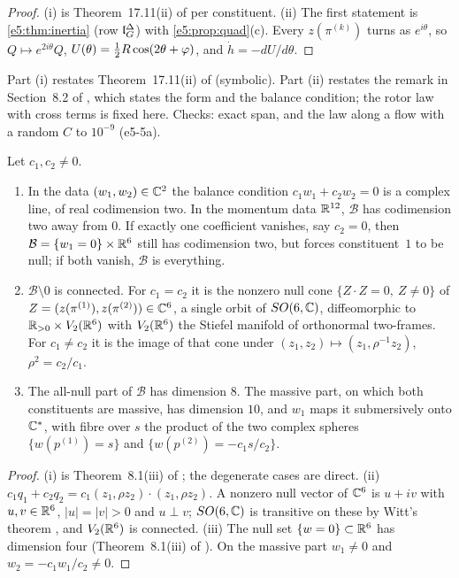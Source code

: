 \begin{proof}
(i) is Theorem~17.11(ii) of \cite{ES17} per constituent. (ii) The first statement is \cref{e5:thm:inertia} (row $\mathfrak l_G^\Delta$) with \cref{e5:prop:quad}(c). Every
$z(\pi^{(k)})$ turns as $e^{i\theta}$, so $Q\mapsto e^{2i\theta}Q$, $U(\theta)=\tfrac12 R\cos(2\theta+\varphi)$, and $\dot h=-dU/d\theta$.
\end{proof}

Part (i) restates Theorem~17.11(ii) of \cite{ES17} (symbolic). Part (ii) restates the remark in Section~8.2 of \cite{RE}, which states the form and the
balance condition; the rotor law with cross terms is fixed here. Checks: exact span, and the law along a flow with a random $C$ to $10^{-9}$ (e5-5a).

\begin{proposition}
\label{e5:prop:Bgeom}
Let $c_1,c_2\neq0$.
\begin{enumerate}[label=(\roman*),leftmargin=2.2em]
\item In the data $(w_1,w_2)\in\mathbb{C}^2$ the balance condition $c_1w_1+c_2w_2=0$ is a complex line, of real codimension two. In the momentum data
$\mathbb{R}^{12}$, $\mathcal B$ has codimension two away from $0$. If exactly one coefficient vanishes, say $c_2=0$, then $\mathcal B=\{w_1=0\}\times\mathbb{R}^6$
still has codimension two, but forces constituent~$1$ to be null; if both vanish, $\mathcal B$ is everything.
\item $\mathcal B\setminus0$ is connected. For $c_1=c_2$ it is the nonzero null cone $\{Z\cdot Z=0,\ Z\neq0\}$ of $Z=(z(\pi^{(1)}),z(\pi^{(2)}))\in\mathbb{C}^6$,
a single orbit of $SO(6,\mathbb{C})$, diffeomorphic to $\mathbb{R}_{>0}\times V_2(\mathbb{R}^6)$ with $V_2(\mathbb{R}^6)$ the Stiefel manifold of orthonormal two-frames. For $c_1\neq c_2$
it is the image of that cone under $(z_1,z_2)\mapsto(z_1,\rho^{-1}z_2)$, $\rho^2=c_2/c_1$.
\item The all-null part of $\mathcal B$ has dimension $8$. The massive part, on which both constituents are massive, has dimension $10$, and $w_1$ maps it
submersively onto $\mathbb{C}^*$, with fibre over $s$ the product of the two complex spheres $\{w(p^{(1)})=s\}$ and $\{w(p^{(2)})=-c_1s/c_2\}$.
\end{enumerate}
\end{proposition}

\begin{proof}
(i) is Theorem~8.1(iii) of \cite{RE}; the degenerate cases are direct. (ii) $c_1q_1+c_2q_2=c_1(z_1,\rho z_2)\cdot(z_1,\rho z_2)$. A nonzero null vector of
$\mathbb{C}^6$ is $u+iv$ with $u,v\in\mathbb{R}^6$, $|u|=|v|>0$ and $u\perp v$; $SO(6,\mathbb{C})$ is transitive on these by Witt's theorem \cite{Witt37}, and $V_2(\mathbb{R}^6)$ is
connected. (iii) The null set $\{w=0\}\subset\mathbb{R}^6$ has dimension four (Theorem~8.1(iii) of \cite{RE}). On the massive part $w_1\neq0$ and $w_2=-c_1w_1/c_2\neq0$.
\end{proof}

